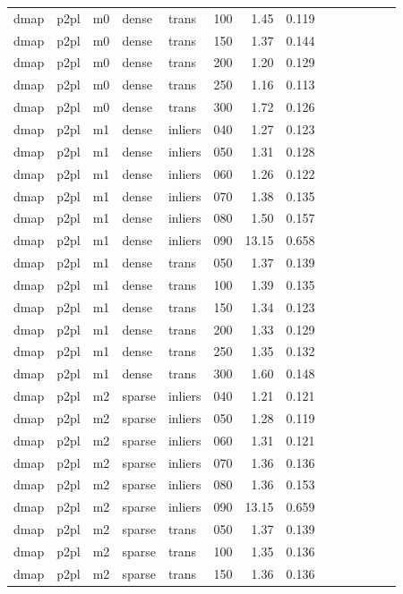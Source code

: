 \begin{table}[htbp]
\begin{tabular}{llllllrrrrrrrr}
  dmap & p2pl & m0 & dense & trans & 100 & 1.45 & 0.119 \\
  dmap & p2pl & m0 & dense & trans & 150 & 1.37 & 0.144 \\
  dmap & p2pl & m0 & dense & trans & 200 & 1.20 & 0.129 \\
  dmap & p2pl & m0 & dense & trans & 250 & 1.16 & 0.113 \\
  dmap & p2pl & m0 & dense & trans & 300 & 1.72 & 0.126 \\
  dmap & p2pl & m1 & dense & inliers & 040 & 1.27 & 0.123 \\
  dmap & p2pl & m1 & dense & inliers & 050 & 1.31 & 0.128 \\
  dmap & p2pl & m1 & dense & inliers & 060 & 1.26 & 0.122 \\
  dmap & p2pl & m1 & dense & inliers & 070 & 1.38 & 0.135 \\
  dmap & p2pl & m1 & dense & inliers & 080 & 1.50 & 0.157 \\
  dmap & p2pl & m1 & dense & inliers & 090 & 13.15 & 0.658 \\
  dmap & p2pl & m1 & dense & trans & 050 & 1.37 & 0.139 \\
  dmap & p2pl & m1 & dense & trans & 100 & 1.39 & 0.135 \\
  dmap & p2pl & m1 & dense & trans & 150 & 1.34 & 0.123 \\
  dmap & p2pl & m1 & dense & trans & 200 & 1.33 & 0.129 \\
  dmap & p2pl & m1 & dense & trans & 250 & 1.35 & 0.132 \\
  dmap & p2pl & m1 & dense & trans & 300 & 1.60 & 0.148 \\
  dmap & p2pl & m2 & sparse & inliers & 040 & 1.21 & 0.121 \\
  dmap & p2pl & m2 & sparse & inliers & 050 & 1.28 & 0.119 \\
  dmap & p2pl & m2 & sparse & inliers & 060 & 1.31 & 0.121 \\
  dmap & p2pl & m2 & sparse & inliers & 070 & 1.36 & 0.136 \\
  dmap & p2pl & m2 & sparse & inliers & 080 & 1.36 & 0.153 \\
  dmap & p2pl & m2 & sparse & inliers & 090 & 13.15 & 0.659 \\
  dmap & p2pl & m2 & sparse & trans & 050 & 1.37 & 0.139 \\
  dmap & p2pl & m2 & sparse & trans & 100 & 1.35 & 0.136 \\
  dmap & p2pl & m2 & sparse & trans & 150 & 1.36 & 0.136 \\

\end{tabular}
\end{table}
